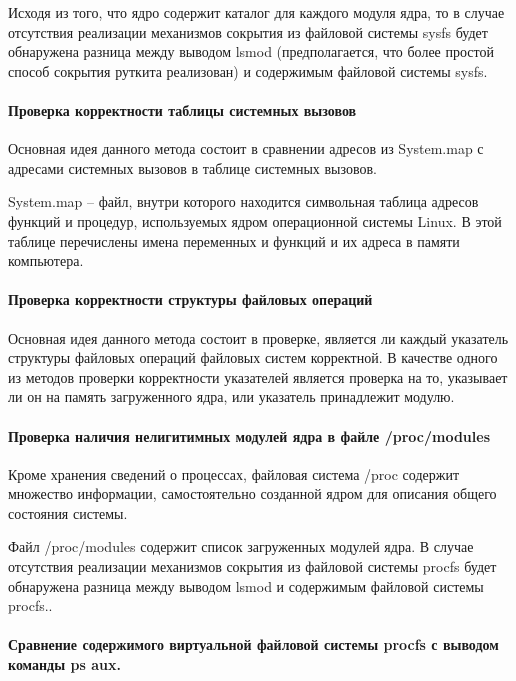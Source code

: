 \documentclass{gost7.32-2001}
\begin{document}
Исходя из того, что ядро содержит каталог для каждого модуля ядра, то
в случае отсутствия реализации механизмов сокрытия из файловой системы
sysfs будет обнаружена разница между выводом lsmod (предполагается,
что более простой способ сокрытия руткита реализован) и содержимым
файловой системы sysfs.

\newpage
\paragraph{Проверка корректности таблицы системных вызовов}

Основная идея данного метода состоит в сравнении адресов из System.map
с адресами системных вызовов в таблице системных вызовов.

System.map – файл, внутри которого находится символьная таблица
адресов функций и процедур, используемых ядром операционной системы
Linux. В этой таблице перечислены имена переменных и функций и их
адреса в памяти компьютера.

\paragraph{Проверка корректности структуры файловых операций}

Основная идея данного метода состоит в проверке, является ли каждый
указатель структуры файловых операций файловых систем корректной. В
качестве одного из методов проверки корректности указателей является
проверка на то, указывает ли он на память загруженного ядра, или
указатель принадлежит модулю.

\paragraph{Проверка наличия нелигитимных модулей ядра в файле /proc/modules}

Кроме хранения сведений о процессах, файловая система /proc содержит
множество информации, самостоятельно созданной ядром для описания
общего состояния системы.

Файл /proc/modules содержит список загруженных модулей ядра. В случае
отсутствия реализации механизмов сокрытия из файловой системы procfs
будет обнаружена разница между выводом lsmod и содержимым файловой
системы procfs..

\paragraph{Сравнение содержимого виртуальной файловой системы procfs с выводом команды ps aux.}
\end{document}
